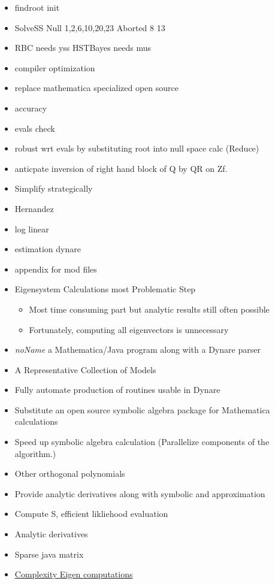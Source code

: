 \documentclass[12pt]{article}
\begin{document}
  \begin{itemize}
  \item findroot init
  \item SolveSS Null 1,2,6,10,20,23 Aborted 8 13
  \item RBC needs yss HSTBayes needs mus
  \item compiler optimization
  \item replace mathematica specialized open source 
  \item accuracy
  \item evals check
  \item robust wrt evals by substituting root into null space calc (Reduce)
  \item anticpate inversion of right hand block of Q by QR on Zf.
  \item Simplify strategically
  \item Hernandez
  \item log linear
  \item estimation dynare
  \item appendix for mod files
\item Eigensystem Calculations most Problematic Step
  \begin{itemize}
  \item Most time consuming part but analytic results still often possible
  \item Fortunately, computing all eigenvectors is unnecessary
  \end{itemize}
  \item {\em noName} a Mathematica/Java program along with a Dynare parser
  \item  A Representative Collection of Models
  \end{itemize}



  \begin{itemize}
  \item Fully automate production of routines usable in Dynare
  \item Substitute an open source symbolic algebra package for Mathematica calculations
  \item Speed up symbolic algebra calculation (Parallelize components of the algorithm.)
  \item Other orthogonal polynomials
\item Provide analytic derivatives along with symbolic and approximation
\item Compute S, efficient likliehood evaluation
\item Analytic derivatives
\item Sparse java matrix
\item \href{http://cstheory.stackexchange.com/questions/2611/complexity-of-finding-the-eigendecomposition-of-a-matrix}{Complexity Eigen computations}
  \end{itemize}
\end{document}
